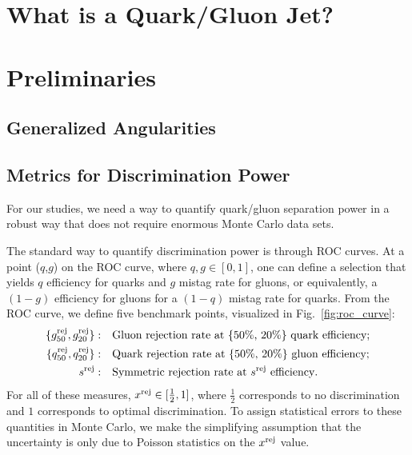 \documentclass[11pt,letterpaper]{article}
\DeclareRobustCommand{\Fig}[1]{Fig.~\ref{#1}}
\begin{document}
\section{What is a Quark/Gluon Jet?}
\label{sec:quarkgluondef}


\section{Preliminaries}

\subsection{Generalized Angularities}

\subsection{Metrics for Discrimination Power}

For our studies, we need a way to quantify quark/gluon separation power in a robust way that does not require enormous Monte Carlo data sets.

The standard way to quantify discrimination power is through ROC curves.  At a point ($q$,$g$) on the ROC curve, where $q,g \in [0,1]$, one can define a selection that yields $q$ efficiency for quarks and $g$ mistag rate for gluons, or equivalently, a $(1-g)$ efficiency for gluons for a $(1-q)$ mistag rate for quarks.  From the ROC curve, we define five benchmark points, visualized in \Fig{fig:roc_curve}:
\begin{align}
\{ g^{\rm  rej}_{50} ,   g^{\rm  rej}_{20}\} : \quad & \text{Gluon rejection rate at \{50\%, 20\%\} quark efficiency}; \\
\{q^{\rm rej}_{50} ,  q^{\rm rej}_{20}\} : \quad & \text{Quark rejection rate at \{50\%, 20\%\} gluon efficiency}; \\
s^{\rm rej} : \quad & \text{Symmetric rejection rate at $s^{\rm rej}$ efficiency}.
\end{align}
For all of these measures, $x^{\rm rej} \in [\frac{1}{2},1]$, where $\frac{1}{2}$ corresponds to no discrimination and $1$ corresponds to optimal discrimination.  To assign statistical errors to these quantities in Monte Carlo, we make the simplifying assumption that the uncertainty is only due to Poisson statistics on the $x^{\rm rej}$ value.
\end{document}
